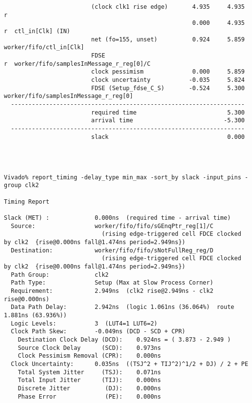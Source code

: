 \documentclass{article}
\begin{document}
\begin{lstlisting}
                         (clock clk1 rise edge)       4.935     4.935 r
                                                      0.000     4.935 r  ctl_in[Clk] (IN)
                         net (fo=155, unset)          0.924     5.859    worker/fifo/ctl_in[Clk]
                         FDSE                                         r  worker/fifo/samplesInMessage_r_reg[0]/C
                         clock pessimism              0.000     5.859
                         clock uncertainty           -0.035     5.824
                         FDSE (Setup_fdse_C_S)       -0.524     5.300    worker/fifo/samplesInMessage_r_reg[0]
  -------------------------------------------------------------------
                         required time                          5.300
                         arrival time                          -5.300
  -------------------------------------------------------------------
                         slack                                  0.000




Vivado% report_timing -delay_type min_max -sort_by slack -input_pins -group clk2

Timing Report

Slack (MET) :             0.000ns  (required time - arrival time)
  Source:                 worker/fifo/fifo/sGEnqPtr_reg[1]/C
                            (rising edge-triggered cell FDCE clocked by clk2  {rise@0.000ns fall@1.474ns period=2.949ns})
  Destination:            worker/fifo/fifo/sNotFullReg_reg/D
                            (rising edge-triggered cell FDCE clocked by clk2  {rise@0.000ns fall@1.474ns period=2.949ns})
  Path Group:             clk2
  Path Type:              Setup (Max at Slow Process Corner)
  Requirement:            2.949ns  (clk2 rise@2.949ns - clk2 rise@0.000ns)
  Data Path Delay:        2.942ns  (logic 1.061ns (36.064%)  route 1.881ns (63.936%))
  Logic Levels:           3  (LUT4=1 LUT6=2)
  Clock Path Skew:        -0.049ns (DCD - SCD + CPR)
    Destination Clock Delay (DCD):    0.924ns = ( 3.873 - 2.949 )
    Source Clock Delay      (SCD):    0.973ns
    Clock Pessimism Removal (CPR):    0.000ns
  Clock Uncertainty:      0.035ns  ((TSJ^2 + TIJ^2)^1/2 + DJ) / 2 + PE
    Total System Jitter     (TSJ):    0.071ns
    Total Input Jitter      (TIJ):    0.000ns
    Discrete Jitter          (DJ):    0.000ns
    Phase Error              (PE):    0.000ns


\end{lstlisting}
\end{document}
